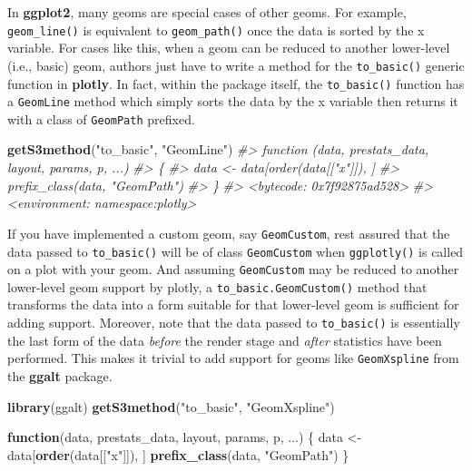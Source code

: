 \documentclass[
  12pt,
]{krantz}
\newenvironment{Shaded}{\begin{snugshade}}{\end{snugshade}}
\newcommand{\CommentTok}[1]{\textcolor[rgb]{0.56,0.35,0.01}{\textit{#1}}}
\newcommand{\ControlFlowTok}[1]{\textcolor[rgb]{0.13,0.29,0.53}{\textbf{#1}}}
\newcommand{\KeywordTok}[1]{\textcolor[rgb]{0.13,0.29,0.53}{\textbf{#1}}}
\newcommand{\NormalTok}[1]{#1}
\newcommand{\StringTok}[1]{\textcolor[rgb]{0.31,0.60,0.02}{#1}}
\begin{document}
In \textbf{ggplot2}, many geoms are special cases of other geoms. For example, \texttt{geom\_line()} is equivalent to \texttt{geom\_path()} once the data is sorted by the x variable. For cases like this, when a geom can be reduced to another lower-level (i.e., basic) geom, authors just have to write a method for the \texttt{to\_basic()} generic function in \textbf{plotly}. In fact, within the package itself, the \texttt{to\_basic()} function has a \texttt{GeomLine} method which simply sorts the data by the x variable then returns it with a class of \texttt{GeomPath} prefixed.

\begin{Shaded}
\begin{Highlighting}[]
\KeywordTok{getS3method}\NormalTok{(}\StringTok{"to_basic"}\NormalTok{, }\StringTok{"GeomLine"}\NormalTok{)}
\CommentTok{#> function (data, prestats_data, layout, params, p, ...) }
\CommentTok{#> \{}
\CommentTok{#>     data <- data[order(data[["x"]]), ]}
\CommentTok{#>     prefix_class(data, "GeomPath")}
\CommentTok{#> \}}
\CommentTok{#> <bytecode: 0x7f92875ad528>}
\CommentTok{#> <environment: namespace:plotly>}
\end{Highlighting}
\end{Shaded}

If you have implemented a custom geom, say \texttt{GeomCustom}, rest assured that the data passed to \texttt{to\_basic()} will be of class \texttt{GeomCustom} when \texttt{ggplotly()} is called on a plot with your geom. And assuming \texttt{GeomCustom} may be reduced to another lower-level geom support by plotly, a \texttt{to\_basic.GeomCustom()} method that transforms the data into a form suitable for that lower-level geom is sufficient for adding support. Moreover, note that the data passed to \texttt{to\_basic()} is essentially the last form of the data \emph{before} the render stage and \emph{after} statistics have been performed. This makes it trivial to add support for geoms like \texttt{GeomXspline} from the \textbf{ggalt} package.

\begin{Shaded}
\begin{Highlighting}[]
\KeywordTok{library}\NormalTok{(ggalt)}
\KeywordTok{getS3method}\NormalTok{(}\StringTok{"to_basic"}\NormalTok{, }\StringTok{"GeomXspline"}\NormalTok{)}
\end{Highlighting}
\end{Shaded}

\begin{Shaded}
\begin{Highlighting}[]
\ControlFlowTok{function}\NormalTok{(data, prestats_data, layout, params, p, ...) \{}
\NormalTok{  data <-}\StringTok{ }\NormalTok{data[}\KeywordTok{order}\NormalTok{(data[[}\StringTok{"x"}\NormalTok{]]), ]}
  \KeywordTok{prefix_class}\NormalTok{(data, }\StringTok{"GeomPath"}\NormalTok{)}
\NormalTok{\}}
\end{Highlighting}
\end{Shaded}
\end{document}
